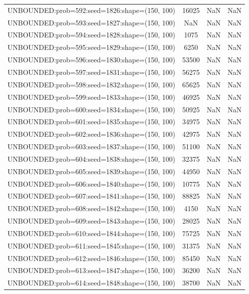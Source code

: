 \begin{longtable}{lccc}
UNBOUNDED:prob=592:seed=1826:shape=(150, 100) & 16025 &   NaN &    NaN \\
UNBOUNDED:prob=593:seed=1827:shape=(150, 100) &   NaN &   NaN &    NaN \\
UNBOUNDED:prob=594:seed=1828:shape=(150, 100) &  1075 &   NaN &    NaN \\
UNBOUNDED:prob=595:seed=1829:shape=(150, 100) &  6250 &   NaN &    NaN \\
UNBOUNDED:prob=596:seed=1830:shape=(150, 100) & 53500 &   NaN &    NaN \\
UNBOUNDED:prob=597:seed=1831:shape=(150, 100) & 56275 &   NaN &    NaN \\
UNBOUNDED:prob=598:seed=1832:shape=(150, 100) & 65625 &   NaN &    NaN \\
UNBOUNDED:prob=599:seed=1833:shape=(150, 100) & 46925 &   NaN &    NaN \\
UNBOUNDED:prob=600:seed=1834:shape=(150, 100) & 50925 &   NaN &    NaN \\
UNBOUNDED:prob=601:seed=1835:shape=(150, 100) & 34975 &   NaN &    NaN \\
UNBOUNDED:prob=602:seed=1836:shape=(150, 100) & 42975 &   NaN &    NaN \\
UNBOUNDED:prob=603:seed=1837:shape=(150, 100) & 51100 &   NaN &    NaN \\
UNBOUNDED:prob=604:seed=1838:shape=(150, 100) & 32375 &   NaN &    NaN \\
UNBOUNDED:prob=605:seed=1839:shape=(150, 100) & 44950 &   NaN &    NaN \\
UNBOUNDED:prob=606:seed=1840:shape=(150, 100) & 10775 &   NaN &    NaN \\
UNBOUNDED:prob=607:seed=1841:shape=(150, 100) & 88825 &   NaN &    NaN \\
UNBOUNDED:prob=608:seed=1842:shape=(150, 100) &  4150 &   NaN &    NaN \\
UNBOUNDED:prob=609:seed=1843:shape=(150, 100) & 28025 &   NaN &    NaN \\
UNBOUNDED:prob=610:seed=1844:shape=(150, 100) & 75725 &   NaN &    NaN \\
UNBOUNDED:prob=611:seed=1845:shape=(150, 100) & 31375 &   NaN &    NaN \\
UNBOUNDED:prob=612:seed=1846:shape=(150, 100) & 85450 &   NaN &    NaN \\
UNBOUNDED:prob=613:seed=1847:shape=(150, 100) & 36200 &   NaN &    NaN \\
UNBOUNDED:prob=614:seed=1848:shape=(150, 100) & 38700 &   NaN &    NaN \\

\end{longtable}
